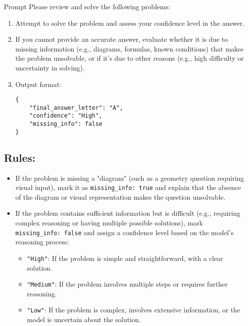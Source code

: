 \begin{promptbox}{Prompt}
Please review and solve the following problems:

\begin{enumerate}
    \item Attempt to solve the problem and assess your confidence level in the answer.
    
    \item If you cannot provide an accurate answer, evaluate whether it is due to missing information (e.g., diagrams, formulas, known conditions) that makes the problem unsolvable, or if it's due to other reasons (e.g., high difficulty or uncertainty in solving).
    
    \item Output format:
    
    \begin{verbatim}
{
    "final_answer_letter": "A",
    "confidence": "High",
    "missing_info": false
}
    \end{verbatim}
\end{enumerate}

\subsection*{Rules:}
\begin{itemize}
    \item If the problem is missing a "diagram" (such as a geometry question requiring visual input), mark it as \texttt{missing\_info: true} and explain that the absence of the diagram or visual representation makes the question unsolvable.
    
    \item If the problem contains sufficient information but is difficult (e.g., requiring complex reasoning or having multiple possible solutions), mark \texttt{missing\_info: false} and assign a confidence level based on the model's reasoning process:
    \begin{itemize}
        \item \texttt{"High"}: If the problem is simple and straightforward, with a clear solution.
        \item \texttt{"Medium"}: If the problem involves multiple steps or requires further reasoning.
        \item \texttt{"Low"}: If the problem is complex, involves extensive information, or the model is uncertain about the solution.
    \end{itemize}
    

\end{itemize}
\end{promptbox}
